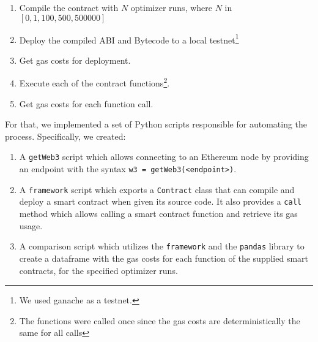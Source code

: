 \begin{enumerate}
  \item Compile the contract with $N$ optimizer runs, where $N$ in $[0, 1, 100, 500, 500000]$ 
  \item Deploy the compiled ABI and Bytecode to a local testnet\footnote{We used ganache as a testnet.}
  \item Get gas costs for deployment.
  \item Execute each of the contract functions\footnote{The functions were called once since the gas costs are deterministically the same for all calls}.
  \item Get gas costs for each function call.
\end{enumerate}

For that, we implemented a set of Python scripts responsible for automating the process. Specifically, we created:
\begin{enumerate}
  \item A \texttt{getWeb3} script which allows connecting to an Ethereum node by providing an endpoint with the syntax \texttt{w3 = getWeb3(<endpoint>)}.
  \item A \texttt{framework} script which exports a \texttt{Contract} class that can compile and deploy a smart contract when given its source code. It also provides a \texttt{call} method which allows calling a smart contract function and retrieve its gas usage. 
  \item A comparison script which utilizes the \texttt{framework} and the \texttt{pandas} library to create a dataframe with the gas costs for each function of the supplied smart contracts, for the specified optimizer runs.
\end{enumerate}
